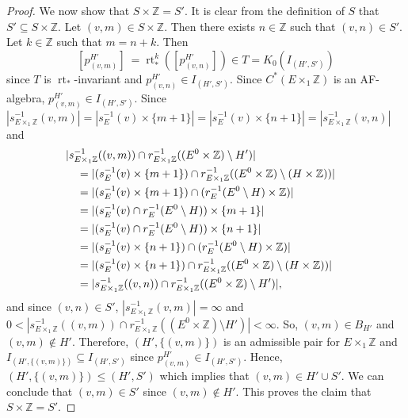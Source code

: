 \documentclass[12pt]{amsbook}%
\newcommand{\lt}{\operatorname{rt}}
\theoremstyle{defin}
\theoremstyle{remark}
\numberwithin{equation}{chapter}
\numberwithin{theor}{section}
\newcommand{\ZZ}{\mathbb{Z}}
\begin{document}
\begin{proof}
We now show that $S \times \ZZ = S'$.  It is clear from the definition of $S$ that $S ' \subseteq S \times \ZZ$.  Let $(v, m ) \in S \times \ZZ$.  Then there exists $n \in \ZZ$ such that $(v, n ) \in S'$.  Let $k \in \ZZ$ such that $m = n+k$.  Then 
\[
[ p_{(v, m)}^{H'} ] \ = \lt_*^k ( [p_{(v, n)}^{H'} ] ) \in T = K_0 ( I_{(H', S') })
\] 
since $T$ is $\lt_*$-invariant and $p_{(v,n)}^{H'} \in I_{(H',S')}$.  Since $C^*(E \times_1 \ZZ )$ is an AF-algebra, $p_{(v,m)}^{H'} \in I_{ (H',S')}$.  Since $|s_{ E \times_1 \ZZ}^{-1} ( v, m)| = |s_{E}^{-1} (v) \times \{ m + 1 \}|= |s_{E}^{-1} (v) \times \{ n + 1 \}| = |s_{ E \times_1 \ZZ}^{-1} ( v, n)|$ and 
\begin{align*}
\lefteqn{| s_{E\times_1\ZZ}^{-1} ( (v,m) ) \cap r_{E\times_1\ZZ}^{-1} ( (E^0 \times\ZZ) \setminus H') |} \\
			&\quad =  | ( s_{E}^{-1} (v) \times \{ m + 1 \} ) \cap   r_{E\times_1\ZZ}^{-1} ( (E^0 \times\ZZ) \setminus (H \times \ZZ ) ) | \\
				&\quad =  | ( s_{E}^{-1} (v) \times \{ m + 1 \} ) \cap  ( r_{E}^{-1} ( E^0 \setminus H ) \times \ZZ )  | \\
				&\quad = | ( s_E^{-1}(v) \cap  r_{E}^{-1} ( E^0 \setminus H ) ) \times \{ m+1 \} | \\
				&\quad = | ( s_E^{-1}(v) \cap  r_{E}^{-1} ( E^0 \setminus H ) ) \times \{ n+1 \} | \\
				&\quad =  | ( s_{E}^{-1} (v) \times \{ n + 1 \} ) \cap  ( r_{E}^{-1} ( E^0 \setminus H ) \times \ZZ ) | \\
				&\quad =  | ( s_{E}^{-1} (v) \times \{ n + 1 \} ) \cap   r_{E\times_1\ZZ}^{-1} ( (E^0 \times\ZZ) \setminus (H \times \ZZ ) ) | \\
				&\quad = | s_{E\times_1\ZZ}^{-1} ( (v,n) ) \cap r_{E\times_1\ZZ}^{-1} ( (E^0 \times\ZZ) \setminus H') |, 
\end{align*}
and since $(v,n) \in S'$, $| s_{ E \times_1 \ZZ}^{-1} ( v, m)  | = \infty$ and $0 < | s_{E\times_1\ZZ}^{-1} ( (v,m) ) \cap r_{E\times_1\ZZ}^{-1} ( (E^0 \times\ZZ) \setminus H') | <\infty$.  So, $(v, m) \in B_{H'}$ and $(v,m) \notin H'$.  Therefore, $( H ' , \{ (v,m) \} )$ is an admissible pair for $E \times_1 \ZZ$ and $I_{( H ' , \{ (v,m) \} )} \subseteq  I_{ (H',S')}$ since $p_{(v,m)}^{H'} \in I_{ (H',S')}$.  Hence, $( H ' , \{ (v,m) \} ) \leq (H',S')$ which implies that $(v,m) \in H' \cup S'$.  We can conclude that $(v,m) \in S'$ since $(v,m) \notin H'$.  This proves the claim that $S \times \ZZ = S'$.


\end{proof}
\end{document}
